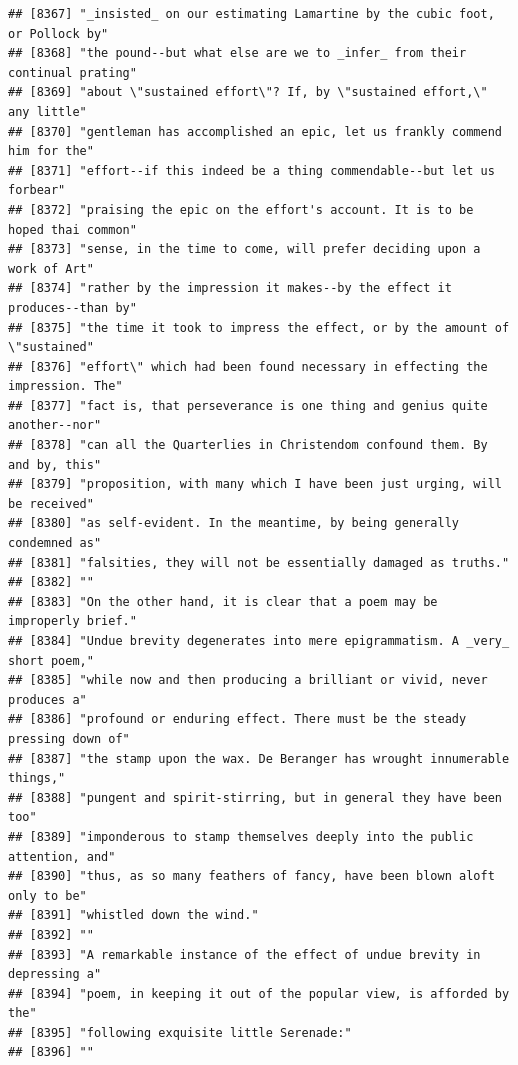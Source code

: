 \documentclass{article}\usepackage[]{graphicx}\usepackage[]{color}
\makeatletter
\newenvironment{kframe}{%
 \def\at@end@of@kframe{}%
 \ifinner\ifhmode%
  \def\at@end@of@kframe{\end{minipage}}%
  \begin{minipage}{\columnwidth}%
 \fi\fi%
 \def\FrameCommand##1{\hskip\@totalleftmargin \hskip-\fboxsep
 \colorbox{shadecolor}{##1}\hskip-\fboxsep
     \hskip-\linewidth \hskip-\@totalleftmargin \hskip\columnwidth}%
 \MakeFramed {\advance\hsize-\width
   \@totalleftmargin\z@ \linewidth\hsize
   \@setminipage}}%
 {\par\unskip\endMakeFramed%
 \at@end@of@kframe}
\newenvironment{knitrout}{}{} %
\makeatother
\begin{document}
\begin{knitrout}
\begin{kframe}
\begin{verbatim}
## [8367] "_insisted_ on our estimating Lamartine by the cubic foot, or Pollock by"     
## [8368] "the pound--but what else are we to _infer_ from their continual prating"     
## [8369] "about \"sustained effort\"? If, by \"sustained effort,\" any little"         
## [8370] "gentleman has accomplished an epic, let us frankly commend him for the"      
## [8371] "effort--if this indeed be a thing commendable--but let us forbear"           
## [8372] "praising the epic on the effort's account. It is to be hoped thai common"    
## [8373] "sense, in the time to come, will prefer deciding upon a work of Art"         
## [8374] "rather by the impression it makes--by the effect it produces--than by"       
## [8375] "the time it took to impress the effect, or by the amount of \"sustained"     
## [8376] "effort\" which had been found necessary in effecting the impression. The"    
## [8377] "fact is, that perseverance is one thing and genius quite another--nor"       
## [8378] "can all the Quarterlies in Christendom confound them. By and by, this"       
## [8379] "proposition, with many which I have been just urging, will be received"      
## [8380] "as self-evident. In the meantime, by being generally condemned as"           
## [8381] "falsities, they will not be essentially damaged as truths."                  
## [8382] ""                                                                            
## [8383] "On the other hand, it is clear that a poem may be improperly brief."         
## [8384] "Undue brevity degenerates into mere epigrammatism. A _very_ short poem,"     
## [8385] "while now and then producing a brilliant or vivid, never produces a"         
## [8386] "profound or enduring effect. There must be the steady pressing down of"      
## [8387] "the stamp upon the wax. De Beranger has wrought innumerable things,"         
## [8388] "pungent and spirit-stirring, but in general they have been too"              
## [8389] "imponderous to stamp themselves deeply into the public attention, and"       
## [8390] "thus, as so many feathers of fancy, have been blown aloft only to be"        
## [8391] "whistled down the wind."                                                     
## [8392] ""                                                                            
## [8393] "A remarkable instance of the effect of undue brevity in depressing a"        
## [8394] "poem, in keeping it out of the popular view, is afforded by the"             
## [8395] "following exquisite little Serenade:"                                        
## [8396] ""                                                                            

\end{verbatim}
\end{kframe}
\end{knitrout}
\end{document}
